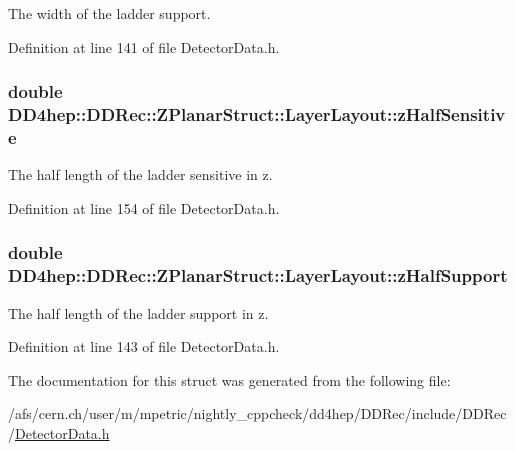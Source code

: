 The width of the ladder support. 

Definition at line 141 of file DetectorData.h.\hypertarget{struct_d_d4hep_1_1_d_d_rec_1_1_z_planar_struct_1_1_layer_layout_ae8c448242045e1e213990a74150b5df7}{
\subsubsection[{zHalfSensitive}]{\setlength{\rightskip}{0pt plus 5cm}double {\bf DD4hep::DDRec::ZPlanarStruct::LayerLayout::zHalfSensitive}}}
\label{struct_d_d4hep_1_1_d_d_rec_1_1_z_planar_struct_1_1_layer_layout_ae8c448242045e1e213990a74150b5df7}


The half length of the ladder sensitive in z. 

Definition at line 154 of file DetectorData.h.\hypertarget{struct_d_d4hep_1_1_d_d_rec_1_1_z_planar_struct_1_1_layer_layout_abc36f1593bf58e3ccae337babd8be4d5}{
\subsubsection[{zHalfSupport}]{\setlength{\rightskip}{0pt plus 5cm}double {\bf DD4hep::DDRec::ZPlanarStruct::LayerLayout::zHalfSupport}}}
\label{struct_d_d4hep_1_1_d_d_rec_1_1_z_planar_struct_1_1_layer_layout_abc36f1593bf58e3ccae337babd8be4d5}


The half length of the ladder support in z. 

Definition at line 143 of file DetectorData.h.

The documentation for this struct was generated from the following file:\begin{DoxyCompactItemize}
\item 
/afs/cern.ch/user/m/mpetric/nightly\_\-cppcheck/dd4hep/DDRec/include/DDRec/\hyperlink{_detector_data_8h}{DetectorData.h}\end{DoxyCompactItemize}
